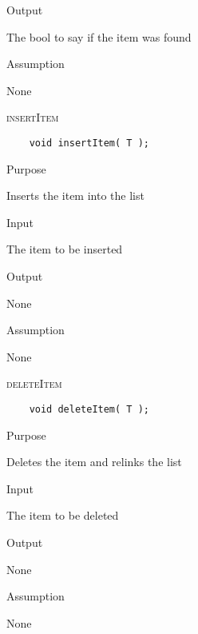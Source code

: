 \documentclass[pdftex, 11pt]{article}
\begin{document}
\begin{description}
\begin{description}
			\item{Output}

				The bool to say if the item was found

			\item{Assumption}

				None

		\end{description}

	\item{\textsc{insertItem}}
\begin{lstlisting}
	void insertItem( T );
\end{lstlisting}

		\begin{description}

			\item{Purpose}

				Inserts the item into the list

			\item{Input}

				The item to be inserted

			\item{Output}

				None

			\item{Assumption}

				None

		\end{description}

	\item{\textsc{deleteItem}}
\begin{lstlisting}
	void deleteItem( T );
\end{lstlisting}

		\begin{description}

			\item{Purpose}

				Deletes the item and relinks the list 

			\item{Input}

				The item to be deleted

			\item{Output}

				None

			\item{Assumption}

				None

		\end{description}


\end{description}
\end{document}
